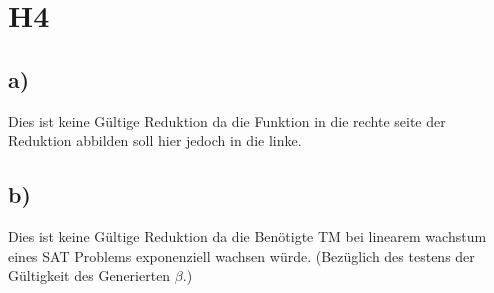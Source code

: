 \section*{H4}

\subsection{a)}

Dies ist keine Gültige Reduktion da die Funktion in die rechte seite der Reduktion abbilden soll hier jedoch in die linke.

\subsection{b)}

Dies ist keine Gültige Reduktion da die Benötigte TM bei linearem wachstum eines SAT Problems exponenziell wachsen würde. (Bezüglich des testens der Gültigkeit des Generierten $\beta$.)
